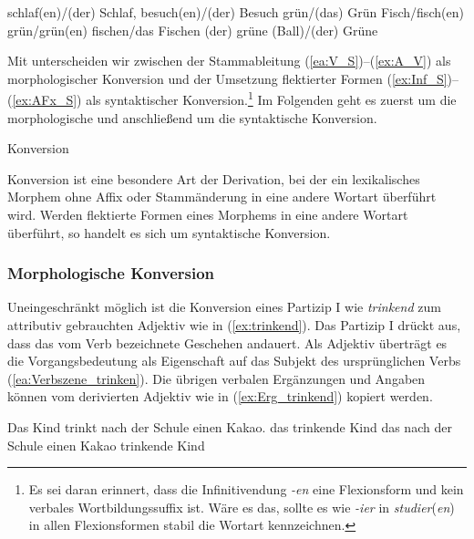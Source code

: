 \ea \label{ea:Konversionen}
\ea \label{ea:V_S} schlaf(en)/(der) Schlaf, besuch(en)/(der) Besuch
\ex \label{ex:A_S} grün/(das) Grün
\ex \label{ex:S_V} Fisch/fisch(en)
\ex \label{ex:A_V} grün/grün(en)
\ex \label{ex:Inf_S} fischen/das Fischen
\ex \label{ex:AFx_S} (der) grüne (Ball)/(der) Grüne
\z 
\z 


Mit \citet[31]{Erben2006_1975} unterscheiden wir zwischen der Stammableitung (\ref{ea:V_S})--(\ref{ex:A_V}) als morphologischer Konversion und der Umsetzung flektierter Formen (\ref{ex:Inf_S})--(\ref{ex:AFx_S}) als syntaktischer Konversion.\footnote{Es sei daran erinnert, dass die Infinitivendung \textit{-en} eine Flexionsform und kein verbales Wortbildungssuffix ist. Wäre es das, sollte es wie \textit{-ier} in \textit{studier}(\textit{en}) in allen Flexionsformen stabil die Wortart kennzeichnen.} Im Folgenden geht es zuerst um die morphologische und anschließend um die syntaktische Konversion.

\begin{Definition}{Konversion}
    
\noindent Konversion ist eine besondere Art der Derivation, bei der ein lexikalisches Morphem ohne Affix oder Stammänderung in eine andere Wortart überführt wird. Werden flektierte Formen eines Morphems in eine andere Wortart überführt, so handelt es sich um syntaktische Konversion.
\end{Definition}



\subsubsection{Morphologische Konversion}\label{subsubsection:MorphKonv}

Uneingeschränkt möglich ist die Konversion eines Partizip I wie \textit{trinkend} zum attributiv gebrauchten Adjektiv wie in (\ref{ex:trinkend}). Das Partizip I drückt aus, dass das vom Verb bezeichnete Geschehen andauert. Als Adjektiv überträgt es die Vorgangsbedeutung als Eigenschaft auf das Subjekt des ursprünglichen Verbs (\ref{ea:Verbszene_trinken}). Die übrigen verbalen Ergänzungen und Angaben können vom derivierten Adjektiv wie in (\ref{ex:Erg_trinkend}) kopiert werden.

\ea \label{ea:Partizip1_Adjektiv}
\ea \label{ea:Verbszene_trinken} Das Kind trinkt nach der Schule einen Kakao.
\ex \label{ex:trinkend} das trinkende Kind
\ex \label{ex:Erg_trinkend} das nach der Schule einen Kakao trinkende Kind
\z 
\z 

